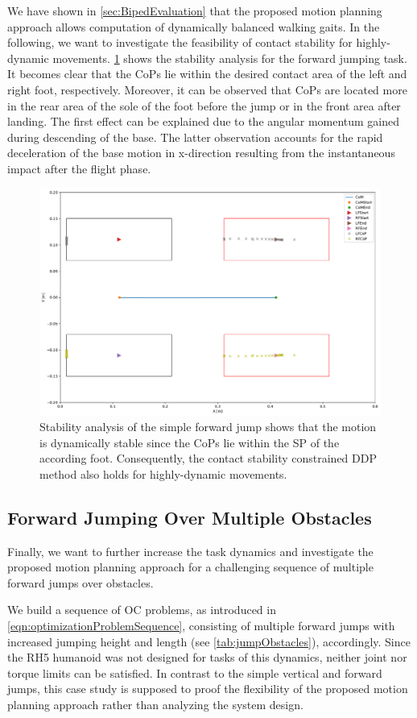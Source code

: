 We have shown in \cref{sec:BipedEvaluation} that the proposed motion planning approach allows computation of dynamically balanced walking gaits. In the following, we want to investigate the feasibility of contact stability for highly-dynamic movements. \cref{fig:jumpForward_StabilityAnalysis} shows the stability analysis for the forward jumping task. It becomes clear that the \gls{CoP}s lie within the desired contact area of the left and right foot, respectively. Moreover, it can be observed that \gls{CoP}s are located more in the rear area of the sole of the foot before the jump or in the front area after landing. The first effect can be explained due to the angular momentum gained during descending of the base. The latter observation accounts for the rapid deceleration of the base motion in x-direction resulting from the instantaneous impact after the flight phase.    
\begin{figure}
\centering	
\includegraphics[width=.7\textwidth]{fig/jumpForward/StabilityAnalysis}
\caption[Stability analysis of the simple forward jump]{Stability analysis of the simple forward jump shows that the motion is dynamically stable since the \gls{CoP}s lie within the \gls{SP} of the according foot. Consequently, the contact stability constrained \gls{DDP} method also holds for highly-dynamic movements. }
\label{fig:jumpForward_StabilityAnalysis}
\end{figure} 

\subsection{Forward Jumping Over Multiple Obstacles}
Finally, we want to further increase the task dynamics and investigate the proposed motion planning approach for a challenging sequence of multiple forward jumps over obstacles. 

We build a sequence of \gls{OC} problems, as introduced in \cref{eqn:optimizationProblemSequence}, consisting of multiple forward jumps with increased jumping height and length (see \cref{tab:jumpObstacles}), accordingly. Since the RH5 humanoid was not designed for tasks of this dynamics, neither joint nor torque limits can be satisfied. In contrast to the simple vertical and forward jumps, this case study is supposed to proof the flexibility of the proposed motion planning approach rather than analyzing the system design. 

